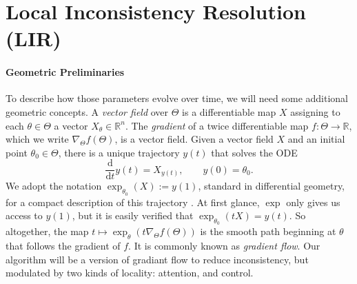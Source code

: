 \section{Local Inconsistency Resolution (LIR)}

\paragraph{Geometric Preliminaries}
To describe how those parameters evolve over time, we will need some additional geometric concepts.
A \emph{vector field} over $\Theta$ is a differentiable
    map $X$ assigning to each $\theta \in \Theta$ a vector $X_\theta \in \mathbb R^n$.
The \emph{gradient} of a twice differentiable map $f : \Theta \to \mathbb R$,
    which we write $\nabla_\Theta f(\Theta)$, is a vector field.
Given a vector field  $X$ and an initial point $\theta_0 \in \Theta$, there is a unique trajectory $y(t)$ that solves the ODE
\[
\frac{\mathrm d }{\mathrm d t}y(t) = X_{y(t)}
,\qquad
y(0) = \theta_0.
\]
We adopt the notation $\exp_{\theta_0}( X ) := y(1)$,
    standard in differential geometry,
    for a compact description of 
    this trajectory
    \citep{lee.smooth-manifolds}.
At first glance,
$\exp$ only gives us access to $y(1)$,
    but
     it is easily verified
     that $\exp_{\theta_0}(t X) = y(t)$.
So altogether, the map $t\mapsto \exp_\theta(t \nabla_\Theta f(\Theta))$ is the smooth path beginning at $\theta$ that follows the gradient of $f$. It is commonly known as \emph{gradient flow}.
Our algorithm will be a version of gradiant flow to reduce inconsistency, but modulated by two kinds of locality: attention, and control. 

